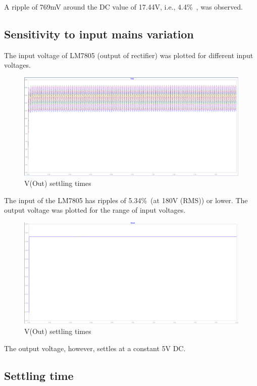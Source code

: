 \documentclass{article}
\begin{document}
A ripple of 769mV around the DC value of 17.44V, i.e., 4.4\%\ , was observed.


\subsection{Sensitivity to input mains variation}

The input voltage of LM7805 (output of rectifier) was plotted for different input voltages.

\begin{figure}[h!]
\centerline{\includegraphics[scale=.4]{Images/4.PNG}}
\caption{V(Out) settling times}
\label{figb}
\end{figure}

The input of the LM7805 has ripples of 5.34\%\ (at 180V (RMS)) or lower. 
\newpage
The output voltage was plotted for the range of input voltages.

\begin{figure}[h!]
\centerline{\includegraphics[scale=.4]{Images/5.PNG}}
\caption{V(Out) settling times}
\label{figb}
\end{figure}

 The output voltage, however, settles at a constant 5V DC.

\subsection{Settling time}
\end{document}
